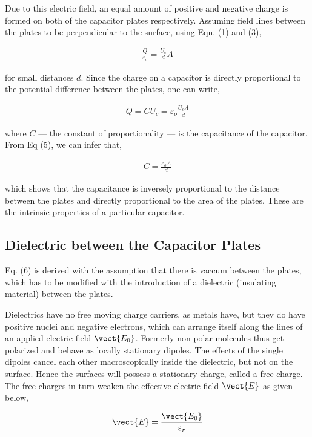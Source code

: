 Due to this electric field, an equal amount of positive and negative charge is formed on both of the capacitor plates respectively. Assuming field lines between the plates to be perpendicular to the surface, using Eqn. (1) and (3), 

\begin{align}
    \frac{Q}{\varepsilon_o} = \frac{U_c}{d}A
\end{align}

for small distances $d$.
Since the charge on a capacitor is directly proportional to the potential difference between the plates, one can write,

\begin{align}
    Q = CU_c = \varepsilon_o\frac{U_cA}{d}
\end{align}

where $C$ --- the constant of proportionality --- is the capacitance of the capacitor. From Eq (5), we can infer that,

\begin{align}
    C = \frac{\varepsilon_oA}{d}
\end{align}

which shows that the capacitance is inversely proportional to the distance between the plates and directly proportional to the area of the plates. These are the intrinsic properties of a particular capacitor.

\subsection*{Dielectric between the Capacitor Plates}

Eq. (6) is derived with the assumption that there is vaccum between the plates, which has to be modified with the introduction of a dielectric (insulating material) between the plates. 

Dielectrics have no free moving charge carriers, as metals have, but they do have positive nuclei and negative electrons, which can arrange itself along the lines of an applied electric field $\vect{E_0}$. Formerly non-polar molecules thus get polarized and behave as locally stationary dipoles. The effects of the single dipoles cancel each other macroscopically inside the dielectric, but not on the surface. Hence the surfaces will possess a stationary charge, called a free charge. The free  charges in turn weaken the effective electric field $\vect{E}$ as given below,

\begin{align}
    \vect{E} =\frac{\vect{E_0}}{\varepsilon_r}
\end{align}

